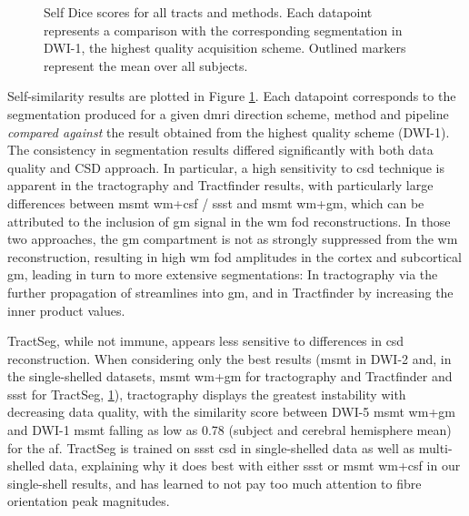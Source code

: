 
\begin{figure}
  \centering
  
  \caption{Self Dice scores for all tracts and methods. Each datapoint represents a comparison with the corresponding segmentation in DWI-1, the highest quality acquisition scheme. Outlined markers represent the mean over all subjects.}
  \label{fig:self_dice}
\end{figure}

Self-similarity results are plotted in Figure \ref{fig:self_dice}.
Each datapoint corresponds to the segmentation produced for a given \gls{dmri} direction scheme, method and pipeline \textit{compared against} the result obtained from the highest quality scheme (DWI-1).
The consistency in segmentation results differed significantly with both data quality and CSD approach.
In particular, a high sensitivity to \gls{csd} technique is apparent in the tractography and Tractfinder results, with particularly large differences between \gls{msmt} \gls{wm}+\gls{csf} / \gls{ssst} and \gls{msmt} \gls{wm}+\gls{gm}, which can be attributed to the inclusion of \gls{gm} signal in the \gls{wm} \gls{fod} reconstructions.
In those two approaches, the \gls{gm} compartment is not as strongly suppressed from the \gls{wm} reconstruction, resulting in high \gls{wm} \gls{fod} amplitudes in the cortex and subcortical \gls{gm}, leading in turn to more extensive segmentations:
In tractography via the further propagation of streamlines into \gls{gm}, and in Tractfinder by increasing the inner product values.

TractSeg, while not immune, appears less sensitive to differences in \gls{csd} reconstruction.
When considering only the best results (\gls{msmt} in DWI-2 and, in the single-shelled datasets, \gls{msmt} \gls{wm}+\gls{gm} for tractography and Tractfinder and \gls{ssst} for TractSeg, \ref{fig:self_dice}), tractography displays the greatest instability with decreasing data quality, with the similarity score between DWI-5 \gls{msmt} \gls{wm}+\gls{gm} and DWI-1 \gls{msmt} falling as low as 0.78 (subject and cerebral hemisphere mean) for the \gls{af}.
TractSeg is trained on \gls{ssst} \gls{csd} in single-shelled data as well as multi-shelled data, explaining why it does best with either \gls{ssst} or \gls{msmt} \gls{wm}+\gls{csf} in our single-shell results, and has learned to not pay too much attention to fibre orientation peak magnitudes.

